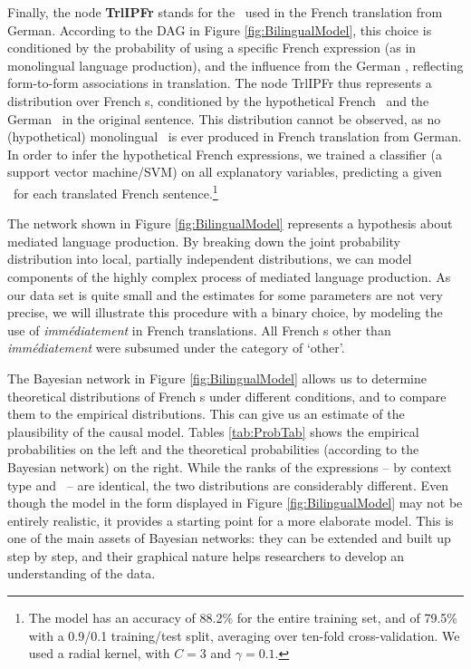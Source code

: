 Finally, the node \textbf{TrlIPFr} stands for the \ipadv\ used in the French
translation from German. According to the DAG in Figure
\ref{fig:BilingualModel}, this choice is conditioned by the
probability of using a specific French expression (as in monolingual
language production), and the influence from the German \ipadv,
reflecting form-to-form associations in translation. 
The node TrlIPFr thus represents a distribution over French \ipadv s,
conditioned by the hypothetical French \ipadv\ and the German \ipadv\
in the original sentence. %
This distribution cannot be observed, as no (hypothetical) monolingual
\ipadv\ is ever produced in French translation from German. In order
to infer the hypothetical French expressions, we trained a classifier
(a support vector machine/SVM) on all explanatory variables, predicting a
given \ipadv\ for each translated French sentence.\footnote{The
  model has an accuracy of 88.2\% for the entire training set, and of
  79.5\% with a 0.9/0.1 training/test split, averaging over ten-fold
  cross-validation. We used a radial kernel, with $C=3$ and
  $\gamma=0.1$.}

The network shown in Figure \ref{fig:BilingualModel} represents a
hypothesis about mediated language production.  By breaking down the
joint probability distribution into local, partially independent
distributions, we can model components of the highly complex process
of mediated language production.
%
As our data set is quite small and the estimates for some parameters
are not very precise, we will illustrate this procedure with a binary
choice, by modeling the use of \textit{immédiatement} in French
translations. All French \ipadv s other than \textit{immédiatement}
were subsumed under the category of `other'.

The Bayesian network in Figure \ref{fig:BilingualModel} allows us to
determine theoretical distributions of French \ipadv s under
different conditions, and to compare them to the empirical
distributions. This can give us an estimate of the plausibility of the
causal model.
%
Tables \ref{tab:ProbTab} shows the empirical probabilities on the left
and the theoretical probabilities (according to the Bayesian network)
on the right. While the ranks of the expressions -- by context type
and \ipadv\ -- are identical, the two distributions are considerably
different. Even though the model in the form displayed in Figure
\ref{fig:BilingualModel} may not be entirely realistic, it provides
a starting point for a more elaborate model. This
is one of the main assets of Bayesian networks: they can be extended
and built up step by step, and their graphical nature helps
researchers to develop an understanding of the data.

